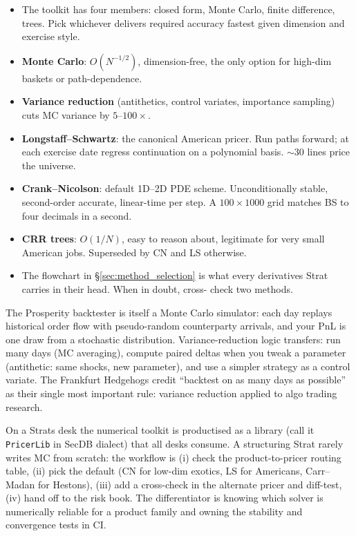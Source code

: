\begin{itemize}
  \item The toolkit has four members: closed form, Monte Carlo, finite
    difference, trees.  Pick whichever delivers required accuracy
    fastest given dimension and exercise style.
  \item \textbf{Monte Carlo}: $O(N^{-1/2})$, dimension-free, the only
    option for high-dim baskets or path-dependence.
  \item \textbf{Variance reduction} (antithetics, control variates,
    importance sampling) cuts MC variance by $5$--$100\times$.
  \item \textbf{Longstaff--Schwartz}: the canonical American pricer.
    Run paths forward; at each exercise date regress continuation on
    a polynomial basis.  $\sim$30 lines price the universe.
  \item \textbf{Crank--Nicolson}: default 1D--2D PDE scheme.
    Unconditionally stable, second-order accurate, linear-time per
    step.  A $100\times 1000$ grid matches BS to four decimals in
    a second.
  \item \textbf{CRR trees}: $O(1/N)$, easy to reason about, legitimate
    for very small American jobs.  Superseded by CN and LS otherwise.
  \item The flowchart in \S\ref{sec:method_selection} is what every
    derivatives Strat carries in their head.  When in doubt, cross-
    check two methods.
\end{itemize}


\begin{prosperitybox}
The Prosperity backtester is itself a Monte Carlo simulator: each day
replays historical order flow with pseudo-random counterparty
arrivals, and your PnL is one draw from a stochastic distribution.
Variance-reduction logic transfers: run many days (MC averaging),
compute paired deltas when you tweak a parameter (antithetic: same
shocks, new parameter), and use a simpler strategy as a control
variate.  The Frankfurt Hedgehogs credit ``backtest on as many days
as possible'' as their single most important rule: variance
reduction applied to algo trading research.
\end{prosperitybox}


\begin{gsbox}
On a Strats desk the numerical toolkit is productised as a library
(call it \verb|PricerLib| in SecDB dialect) that all desks
consume.  A structuring Strat rarely writes MC from scratch: the
workflow is (i) check the product-to-pricer routing table, (ii) pick
the default (CN for low-dim exotics, LS for Americans, Carr--Madan
for Hestons), (iii) add a cross-check in the alternate pricer and
diff-test, (iv) hand off to the risk book.  The differentiator is
knowing which solver is numerically reliable for a product family
and owning the stability and convergence tests in CI.
\end{gsbox}


